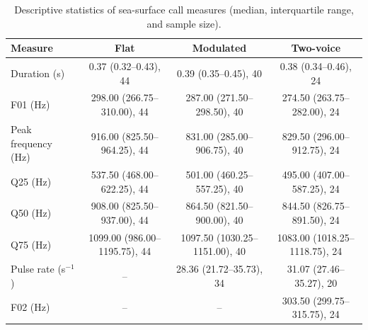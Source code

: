 \begin{table}[!ht]
\centering
\caption{Descriptive statistics of sea-surface call measures (median, interquartile range, and sample size).}
\label{tab:p1desc}
\footnotesize
\begin{tabular}{lccc}
\toprule
Measure & Flat & Modulated & Two-voice \\
\midrule
Duration (s) & 0.37 (0.32--0.43), 44 & 0.39 (0.35--0.45), 40 & 0.38 (0.34--0.46), 24 \\
F01 (Hz) & 298.00 (266.75--310.00), 44 & 287.00 (271.50--298.50), 40 & 274.50 (263.75--282.00), 24 \\
Peak frequency (Hz) & 916.00 (825.50--964.25), 44 & 831.00 (285.00--906.75), 40 & 829.50 (296.00--912.75), 24 \\
Q25 (Hz) & 537.50 (468.00--622.25), 44 & 501.00 (460.25--557.25), 40 & 495.00 (407.00--587.25), 24 \\
Q50 (Hz) & 908.00 (825.50--937.00), 44 & 864.50 (821.50--900.00), 40 & 844.50 (826.75--891.50), 24 \\
Q75 (Hz) & 1099.00 (986.00--1195.75), 44 & 1097.50 (1030.25--1151.00), 40 & 1083.00 (1018.25--1118.75), 24 \\
Pulse rate (s$^{-1}$) & -- & 28.36 (21.72--35.73), 34 & 31.07 (27.46--35.27), 20 \\
F02 (Hz) & -- & -- & 303.50 (299.75--315.75), 24 \\
\bottomrule
\end{tabular}
\end{table}